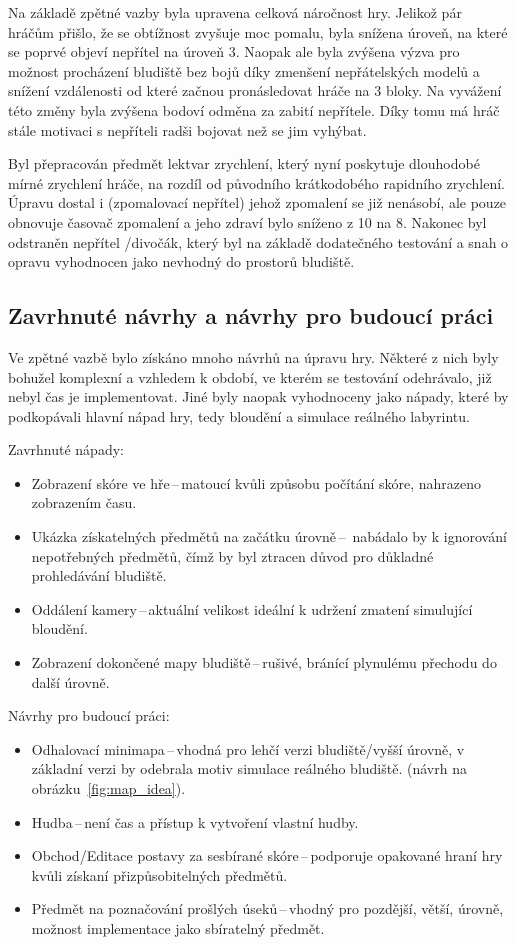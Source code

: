 Na základě zpětné vazby byla upravena celková náročnost hry. Jelikož pár hráčům přišlo, že se obtížnost zvyšuje moc pomalu, byla snížena úroveň, na které se poprvé objeví nepřítel na úroveň 3. Naopak ale byla zvýšena výzva pro možnost procházení bludiště bez bojů díky zmenšení nepřátelských modelů a snížení vzdálenosti od které začnou pronásledovat hráče na 3 bloky. Na vyvážení této změny byla zvýšena bodoví odměna za zabití nepřítele. Díky tomu má hráč stále motivaci s nepříteli radši bojovat než se jim vyhýbat.

Byl přepracován předmět lektvar zrychlení, který nyní poskytuje dlouhodobé mírné zrychlení hráče, na rozdíl od původního krátkodobého rapidního zrychlení. Úpravu dostal i  (zpomalovací nepřítel) jehož zpomalení se již nenásobí, ale pouze obnovuje časovač zpomalení a jeho zdraví bylo sníženo z 10 na 8. Nakonec byl odstraněn nepřítel /divočák, který byl na základě dodatečného testování a snah o opravu vyhodnocen jako nevhodný do prostorů bludiště.

\subsection*{Zavrhnuté návrhy a návrhy pro budoucí práci}
Ve zpětné vazbě bylo získáno mnoho návrhů na úpravu hry. Některé z nich byly bohužel komplexní a vzhledem k období, ve kterém se testování odehrávalo, již nebyl čas je implementovat. Jiné byly naopak vyhodnoceny jako nápady, které by podkopávali hlavní nápad hry, tedy bloudění a simulace reálného labyrintu.

\noindent Zavrhnuté nápady:
\begin{itemize}
    \item Zobrazení skóre ve hře\,--\,matoucí kvůli způsobu počítání skóre, nahrazeno zobrazením času.
    \item  Ukázka získatelných předmětů na začátku úrovně\,--\, nabádalo by k ignorování nepotřebných předmětů, čímž by byl ztracen důvod pro důkladné prohledávání bludiště.
    \item  Oddálení kamery\,--\,aktuální velikost ideální k udržení zmatení simulující bloudění.
    \item Zobrazení dokončené mapy bludiště\,--\,rušivé, bránící plynulému přechodu do další úrovně.
\end{itemize}

\noindent Návrhy pro budoucí práci:
\begin{itemize}
    \item Odhalovací minimapa\,--\,vhodná pro lehčí verzi bludiště/vyšší úrovně, v základní verzi by odebrala motiv simulace reálného bludiště.
    (návrh na obrázku~\ref{fig:map_idea}).
    \item Hudba\,--\,není čas a přístup k vytvoření vlastní hudby.
    \item Obchod/Editace postavy za sesbírané skóre\,--\,podporuje opakované hraní hry kvůli získaní přizpůsobitelných předmětů.
    \item  Předmět na poznačování prošlých úseků\,--\,vhodný pro pozdější, větší, úrovně, možnost implementace jako sbíratelný předmět.
\end{itemize}

